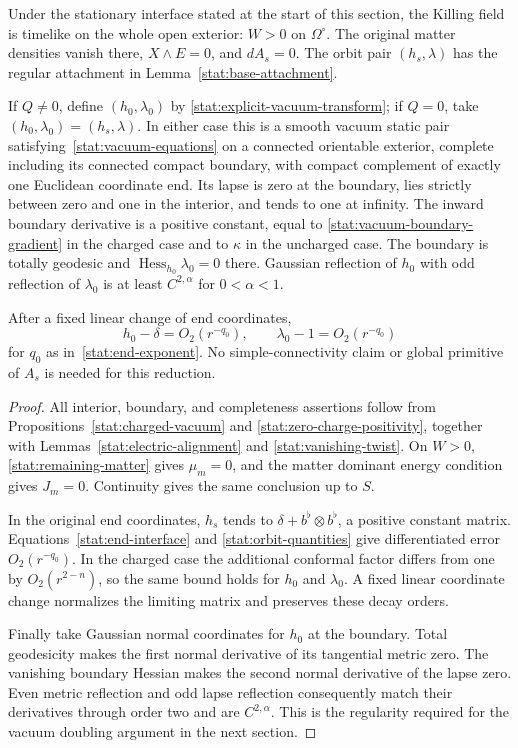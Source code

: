\begin{proposition}
\label{stat:vacuum-reduction}
Under the stationary interface stated at the start of this section,
the Killing field is timelike on the whole open exterior:
$W>0$ on $\Omega^\circ$.  The original matter densities vanish
there, $X\wedge E=0$, and $dA_s=0$.  The orbit pair
$(h_s,\lambda)$ has the regular attachment in
Lemma~\ref{stat:base-attachment}.

If $Q\ne0$, define $(h_0,\lambda_0)$ by
\eqref{stat:explicit-vacuum-transform}; if $Q=0$, take
$(h_0,\lambda_0)=(h_s,\lambda)$.  In either case this is a smooth
vacuum static pair satisfying~\eqref{stat:vacuum-equations} on a
connected orientable exterior, complete including its connected
compact boundary, with compact complement of exactly one Euclidean
coordinate end.  Its lapse is zero at the boundary, lies strictly
between zero and one in the interior, and tends to one at infinity.
The inward boundary derivative is a positive constant, equal to
\eqref{stat:vacuum-boundary-gradient} in the charged case and to
$\kappa$ in the uncharged case.  The boundary is totally geodesic
and $\operatorname{Hess}_{h_0}\lambda_0=0$ there.  Gaussian
reflection of $h_0$ with odd reflection of $\lambda_0$ is at least
$C^{2,\alpha}$ for $0<\alpha<1$.

After a fixed linear change of end coordinates,
\begin{equation}
 h_0-\delta=O_2(r^{-q_0}),\qquad
 \lambda_0-1=O_2(r^{-q_0})
 \label{stat:vacuum-end}
\end{equation}
for $q_0$ as in~\eqref{stat:end-exponent}.  No simple-connectivity
claim or global primitive of $A_s$ is needed for this reduction.
\end{proposition}

\begin{proof}
All interior, boundary, and completeness assertions follow from
Propositions~\ref{stat:charged-vacuum} and
\ref{stat:zero-charge-positivity}, together with
Lemmas~\ref{stat:electric-alignment} and
\ref{stat:vanishing-twist}.  On $W>0$,
\eqref{stat:remaining-matter} gives $\mu_m=0$, and the matter
dominant energy condition gives $J_m=0$.  Continuity gives the
same conclusion up to $S$.

In the original end coordinates, $h_s$ tends to
$\delta+b^\flat\otimes b^\flat$, a positive constant matrix.
Equations~\eqref{stat:end-interface} and
\eqref{stat:orbit-quantities} give differentiated error
$O_2(r^{-q_0})$.  In the charged case the additional conformal
factor differs from one by $O_2(r^{2-n})$, so the same bound holds
for $h_0$ and $\lambda_0$.  A fixed linear coordinate change
normalizes the limiting matrix and preserves these decay orders.

Finally take Gaussian normal coordinates for $h_0$ at the boundary.
Total geodesicity makes the first normal derivative of its
tangential metric zero.  The vanishing boundary Hessian makes the
second normal derivative of the lapse zero.  Even metric reflection
and odd lapse reflection consequently match their derivatives
through order two and are $C^{2,\alpha}$.  This is the regularity
required for the vacuum doubling argument in the next section.
\end{proof}
